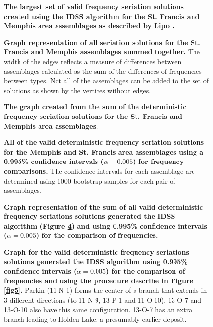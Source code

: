 \documentclass[10pt,letterpaper]{article}
\begin{document}
\begin{figure}[h]
\caption{{\bf The largest set of valid frequency seriation solutions created using the IDSS algorithm for the St. Francis and Memphis area assemblages as described by Lipo \cite{Lipo2001a}.}}
\label{fig14}
\end{figure}

\begin{figure}[h]
\caption{{\bf Graph representation of all seriation solutions for the St. Francis and Memphis assemblages summed together.} The width of the edges reflects a measure of differences between assemblages calculated as the sum of the differences of frequencies between types. Not all of the assemblages can be added to the set of solutions as shown by the vertices without edges.}
\label{fig15}
\end{figure}

\begin{figure}[h]
\caption{{\bf The graph created from the sum of the deterministic frequency seriation solutions for the St. Francis and Memphis area assemblages.}}
\label{fig16}
\end{figure}


\begin{figure}[h]
\caption{{\bf All of the valid deterministic frequency seriation solutions for the Memphis and St. Francis area assemblages using a 0.995\% confidence intervals ($\alpha = 0.005$) for frequency comparisons.} The confidence intervals for each assemblage are determined using 1000 bootstrap samples for each pair of assemblages. }
\label{fig17}
\end{figure}

\begin{figure}[h]
\caption{{\bf Graph representation of the sum of all valid deterministic frequency seriations solutions generated the IDSS algorithm (Figure \ref{fig17}) and using 0.995\% confidence intervals ($\alpha=0.005$) for the comparison of frequencies.} }
\label{fig18}
\end{figure}

\begin{figure}[h]
\caption{{\bf Graph for the valid deterministic frequency seriations solutions generated the IDSS algorithm using 0.995\% confidence intervals ($\alpha=0.005$) for the comparison of frequencies and using the procedure describe in Figure \ref{fig5}.} Parkin (11-N-1) forms the center of a branch that extends in 3 different directions (to 11-N-9, 13-P-1 and 11-O-10). 13-O-7 and 13-O-10 also have this same configuration. 13-O-7 has an extra branch leading to Holden Lake, a presumably earlier deposit. }
\label{fig19}
\end{figure}
\end{document}
